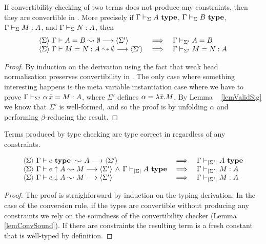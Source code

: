 \begin{lemma} \label{lemConvSound}
    If convertibility checking of two terms does not produce any constraints, then
    they are convertible in {\Core}. More precisely if $\Gamma\vdash_{\Sigma}A ~ \mathbf{type}$,
    $\Gamma\vdash_{\Sigma}B ~ \mathbf{type}$, $\Gamma\vdash_{\Sigma}M:A$, and
    $\Gamma\vdash_{\Sigma}N:A$, then
    \[\begin{array}{lcl}
	\langle {\Sigma} \rangle ~{{\Gamma} \vdash {A} = {B} \leadsto {\emptyset}} \longrightarrow \langle {\Sigma'} \rangle
	    & \implies & \Gamma\vdash_{\Sigma'}A=B \\
	\langle {\Sigma} \rangle ~{{\Gamma} \vdash {M} = {N} : {A} \leadsto {\emptyset}} \longrightarrow \langle {\Sigma'} \rangle
	    & \implies & \Gamma\vdash_{\Sigma'}M=N:A \\
    \end{array}\]
\end{lemma}

\begin{proof}
    By induction on the derivation using the fact that weak head normalisation
    preserves convertibility in {\Core}. The only case where something
    interesting happens is the meta variable instantiation case where we have
    to prove $\Gamma\vdash_{\Sigma'}\alpha\,\bar x=M:A$, where $\Sigma'$
    defines $\alpha = \lambda \bar x.{} M$. By Lemma ~ \ref{lemValidSig} we know
    that $\Sigma'$ is well-formed, and so the proof is by unfolding $\alpha$
    and performing $\beta$-reducing the result.
\end{proof}

\begin{theorem} \label{thmTypeSafety}
    Terms produced by type checking are type correct in {\Core} regardless of any
    constraints.

    \[\begin{array}{lcl}
	{ \langle {\Sigma} \rangle ~{{\Gamma} \vdash {e} ~ \mathbf{type} ~ \leadsto {A}} \longrightarrow \langle {\Sigma'} \rangle }
	& \implies & {\Gamma\vdash_{\left|{\Sigma'}\right|}A ~ \mathbf{type}} \\
	{\langle {\Sigma} \rangle ~{{\Gamma} \vdash {e} \uparrow {A} \leadsto {M}} \longrightarrow \langle {\Sigma'} \rangle}
	\, \wedge \, {\Gamma\vdash_{\left|{\Sigma}\right|}A ~ \mathbf{type}}
	& \implies & \Gamma\vdash_{\left|{\Sigma'}\right|}M:A \\
	{\langle {\Sigma} \rangle ~{{\Gamma} \vdash {e} \downarrow {A} \leadsto {M}} \longrightarrow \langle {\Sigma'} \rangle}
	& \implies & \Gamma\vdash_{\left|{\Sigma'}\right|}M:A
    \end{array}\]
\end{theorem}

\begin{proof}
    The proof is straighforward by induction on the typing derivation. In the
    case of the conversion rule, if the types are convertible without producing
    any constraints we rely on the soundness of the convertibility checker
    (Lemma ~ \ref{lemConvSound}). If there are constraints the resulting term
    is a fresh constant that is well-typed by definition.
\end{proof}

